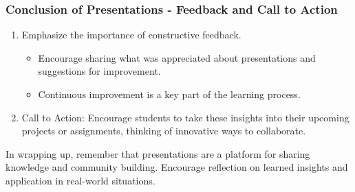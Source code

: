 \documentclass[aspectratio=169]{beamer}
\begin{document}
\begin{frame}[fragile]
    \frametitle{Conclusion of Presentations - Feedback and Call to Action}
    \begin{enumerate}
        \item Emphasize the importance of constructive feedback.
        \begin{itemize}
            \item Encourage sharing what was appreciated about presentations and suggestions for improvement.
            \item Continuous improvement is a key part of the learning process.
        \end{itemize}
        \item Call to Action: Encourage students to take these insights into their upcoming projects or assignments, thinking of innovative ways to collaborate.
    \end{enumerate}
    
    In wrapping up, remember that presentations are a platform for sharing knowledge and community building. Encourage reflection on learned insights and application in real-world situations.
\end{frame}
\end{document}
